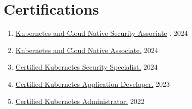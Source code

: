 \documentclass[11pt]{article}
\newcommand{\rside}[1]{
  \hfill {\normalfont\color{gray} #1}%
}
\begin{document}
\section{Certifications}
\begin{enumerate}[label=\null, left=0pt..0pt, itemsep=0pt]
  \item \href{https://www.credly.com/badges/871d71ae-5ad4-4610-a92c-c93145b30d53/public_url}{Kubernetes and Cloud Native Security Associate} . \rside{2024}
  \item \href{https://www.credly.com/badges/0560ea75-b3e7-4bc1-b077-66abd00622b5/public_url}{Kubernetes and Cloud Native Associate.} \rside{2024}
  \item \href{https://www.credly.com/badges/2ff816db-c2e5-4c2c-b87b-2eaaca2e089e/public_url}{Certified Kubernetes Security Specialist.} \rside{2024}
  \item \href{https://www.credly.com/badges/6d2e8ee2-57a0-45eb-99a8-b7875562dc25/public_url}{Certified Kubernetes Application Developer.} \rside{2023}
  \item \href{https://www.credly.com/badges/c0ff3fcc-9513-4fab-ac8a-95061a53f343/public_url}{Certified Kubernetes Administrator.} \rside{2022}
\end{enumerate}




\end{document}
